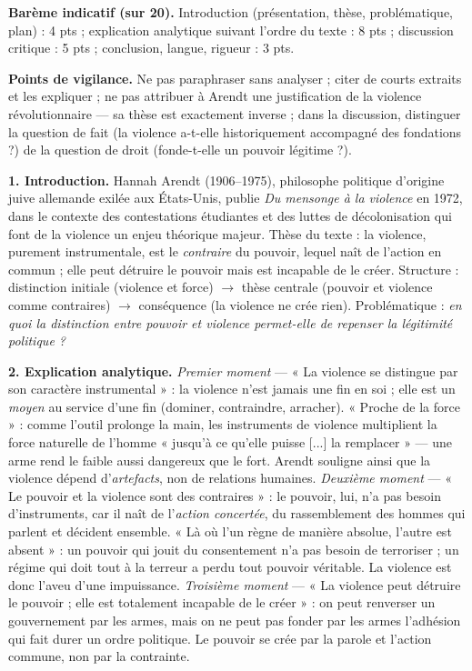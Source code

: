 \documentclass[11pt]{article}
\begin{document}
\begin{corrige}

\textbf{Barème indicatif (sur 20).} Introduction (présentation, thèse, problématique, plan) : 4 pts ; explication analytique suivant l'ordre du texte : 8 pts ; discussion critique : 5 pts ; conclusion, langue, rigueur : 3 pts.

\textbf{Points de vigilance.} Ne pas paraphraser sans analyser ; citer de courts extraits et les expliquer ; ne pas attribuer à Arendt une justification de la violence révolutionnaire — sa thèse est exactement inverse ; dans la discussion, distinguer la question de fait (la violence a-t-elle historiquement accompagné des fondations ?) de la question de droit (fonde-t-elle un pouvoir légitime ?).

\textbf{1. Introduction.} Hannah Arendt (1906--1975), philosophe politique d'origine juive allemande exilée aux États-Unis, publie \emph{Du mensonge à la violence} en 1972, dans le contexte des contestations étudiantes et des luttes de décolonisation qui font de la violence un enjeu théorique majeur. Thèse du texte : la violence, purement instrumentale, est le \emph{contraire} du pouvoir, lequel naît de l'action en commun ; elle peut détruire le pouvoir mais est incapable de le créer. Structure : distinction initiale (violence et force) $\rightarrow$ thèse centrale (pouvoir et violence comme contraires) $\rightarrow$ conséquence (la violence ne crée rien). Problématique : \emph{en quoi la distinction entre pouvoir et violence permet-elle de repenser la légitimité politique ?}

\textbf{2. Explication analytique.} \emph{Premier moment} — « La violence se distingue par son caractère instrumental » : la violence n'est jamais une fin en soi ; elle est un \emph{moyen} au service d'une fin (dominer, contraindre, arracher). « Proche de la force » : comme l'outil prolonge la main, les instruments de violence multiplient la force naturelle de l'homme « jusqu'à ce qu'elle puisse [...] la remplacer » — une arme rend le faible aussi dangereux que le fort. Arendt souligne ainsi que la violence dépend d'\emph{artefacts}, non de relations humaines. \emph{Deuxième moment} — « Le pouvoir et la violence sont des contraires » : le pouvoir, lui, n'a pas besoin d'instruments, car il naît de l'\emph{action concertée}, du rassemblement des hommes qui parlent et décident ensemble. « Là où l'un règne de manière absolue, l'autre est absent » : un pouvoir qui jouit du consentement n'a pas besoin de terroriser ; un régime qui doit tout à la terreur a perdu tout pouvoir véritable. La violence est donc l'aveu d'une impuissance. \emph{Troisième moment} — « La violence peut détruire le pouvoir ; elle est totalement incapable de le créer » : on peut renverser un gouvernement par les armes, mais on ne peut pas fonder par les armes l'adhésion qui fait durer un ordre politique. Le pouvoir se crée par la parole et l'action commune, non par la contrainte.


\end{corrige}
\end{document}
